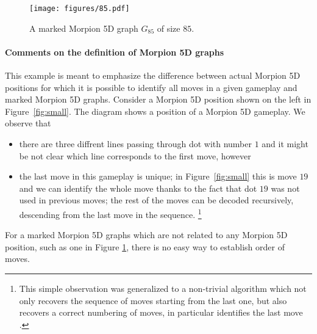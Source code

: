 \begin{figure}[h]
    \centering
    \texttt{[image: figures/85.pdf]}
     \caption{
     A marked Morpion 5D graph $G_{85}$ of size $85$.
	}
    \label{fig:85}
\end{figure}

\paragraph*{Comments on the definition of Morpion 5D graphs}


\begin{example}
This example is meant to emphasize the difference between 
actual Morpion 5D positions for which it is possible to identify all moves in a given gameplay and marked Morpion 5D graphs.
Consider a Morpion 5D position shown on the left in Figure~\ref{fig:small}. %
The diagram shows a position of a Morpion 5D gameplay.
We observe that %
  \begin{itemize}
    \item   there are three diffrent lines passing through dot with number $1$ and it might be not clear which line corresponds to the first move, however
    \item   the last move in this gameplay is unique; in Figure~\ref{fig:small} this is move $19$ and we can identify the whole move thanks to the fact  that dot $19$ was not used in previous moves; the rest of the moves can be decoded recursively, descending from the last move in the sequence. \footnote{This simple observation was generalized to a non-trivial algorithm which not only recovers the sequence of moves starting from the last one, but also recovers a correct numbering of moves, in particular identifies the last move \cite{demaine}.} %
  \end{itemize}
For a marked Morpion 5D graphs which are not related to any Morpion 5D position, such as one in Figure \ref{fig:85}, there is no easy way to establish order of moves.
\end{example}


